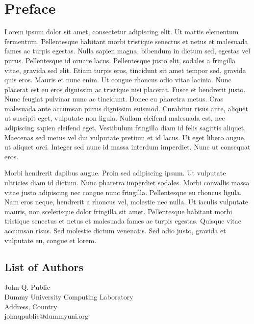 \documentclass[a4paper,UKenglish]{litesmaster-v2021}
\begin{document}
\chapter{Preface} %

Lorem ipsum dolor sit amet, consectetur adipiscing elit. Ut mattis
elementum fermentum. Pellentesque habitant morbi tristique senectus et
netus et malesuada fames ac turpis egestas. Nulla sapien magna,
bibendum in dictum sed, egestas vel purus. Pellentesque id ornare
lacus. Pellentesque justo elit, sodales a fringilla vitae, gravida sed
elit. Etiam turpis eros, tincidunt sit amet tempor sed, gravida quis
eros. Mauris et nunc enim. Ut congue rhoncus odio vitae lacinia. Nunc
placerat est eu eros dignissim ac tristique nisi placerat. Fusce et
hendrerit justo. Nunc feugiat pulvinar nunc ac tincidunt. Donec eu
pharetra metus. Cras malesuada ante accumsan purus dignissim
euismod. Curabitur risus ante, aliquet ut suscipit eget, vulputate non
ligula. Nullam eleifend malesuada est, nec adipiscing sapien eleifend
eget. Vestibulum fringilla diam id felis sagittis aliquet. Maecenas
sed metus vel dui vulputate pretium et id lacus. Ut eget libero augue,
ut aliquet orci. Integer sed nunc id massa interdum imperdiet. Nunc ut
consequat eros.

Morbi hendrerit dapibus augue. Proin sed adipiscing ipsum. Ut
vulputate ultricies diam id dictum. Nunc pharetra imperdiet
sodales. Morbi convallis massa vitae justo adipiscing nec congue nunc
fringilla. Pellentesque eu rhoncus ligula. Nam eros neque, hendrerit a
rhoncus vel, molestie nec nulla. Ut iaculis vulputate mauris, non
scelerisque dolor fringilla sit amet. Pellentesque habitant morbi
tristique senectus et netus et malesuada fames ac turpis
egestas. Quisque vitae accumsan risus. Sed molestie dictum
venenatis. Sed odio justo, gravida et vulputate eu, congue et lorem. 

\begin{participants}
\chapter[Authors]{List of Authors}
\participant John Q. Public\\ 
  Dummy University Computing Laboratory\\
  Address, Country\\
  johnqpublic@dummyuni.org

\end{participants} 
\end{document}
